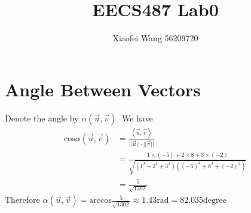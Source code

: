 \documentclass[10pt,twocolumn,twoside,a4paper]{article}
\begin{document}
\title{EECS487 Lab0}
\author{Xiaofei Wang 56209720}
\maketitle
\section*{Angle Between Vectors}
Denote the angle by $\alpha(\vec{u}, \vec{v})$. We have
\begin{align*}
\text{cos}\alpha(\vec{u}, \vec{v})
&=\frac{\left\langle\vec{u}, \vec{v}\right\rangle}{||\vec{u}||\cdot||\vec{v}||}\\
&=\frac{1\times(-5)+2\times8+3\times(-2)}{\sqrt{(1^2+2^2+3^2)((-5)^2+8^2+(-2)^2)}}\\
&=\frac{5}{\sqrt{1302}}
\end{align*}
Therefore $\alpha(\vec{u}, \vec{v})=\text{arccos}\frac{5}{\sqrt{1302}}\approx1.43\text{rad}=82.035\text{degree}$
\end{document}

